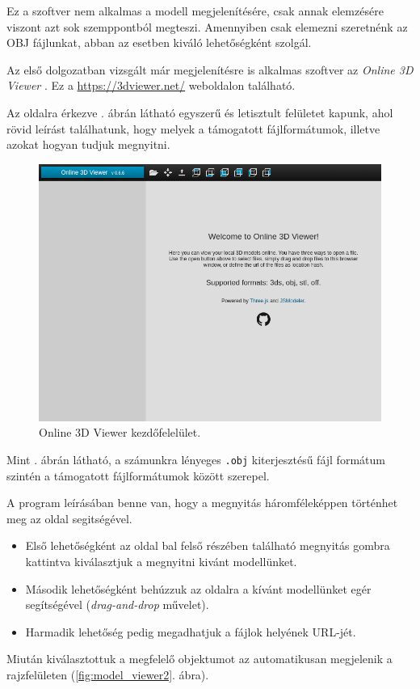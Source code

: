 Ez a szoftver nem alkalmas a modell megjelenítésére, csak annak elemzésére viszont azt sok szemppontból megteszi. Amennyiben csak elemezni szeretnénk az OBJ fájlunkat, abban az esetben kiváló lehetőségként szolgál.


Az első dolgozatban vizsgált már megjelenítésre is alkalmas szoftver az \textit{Online 3D Viewer} \cite{online2014viktor}.
Ez a \url{https://3dviewer.net/} weboldalon található.

Az oldalra érkezve . ábrán látható egyszerű és letisztult felületet kapunk, ahol rövid leírást találhatunk, hogy melyek a támogatott fájlformátumok, illetve azokat hogyan tudjuk megnyitni.

\begin{figure}[h]
\centering
\includegraphics[width=\textwidth]{images/Model_Viewer.png}
\caption{Online 3D Viewer kezdőfelelület.}
\label{fig:model_viewer1}
\end{figure}

Mint . ábrán látható, a számunkra lényeges \texttt{.obj} kiterjesztésű fájl formátum szintén a támogatott fájlformátumok között szerepel.

A program leírásában benne van, hogy a megnyitás háromféleképpen történhet meg az oldal segitségével.
\begin{itemize}
\item Első lehetőségként az oldal bal felső részében található megnyitás gombra kattintva kiválasztjuk a megnyitni kivánt modellünket.
\item Második lehetőségként behúzzuk az oldalra a kívánt modellünket egér segítségével (\textit{drag-and-drop} művelet).
\item Harmadik lehetőség pedig megadhatjuk a fájlok helyének URL-jét.
\end{itemize}
\newpage
Miután kiválasztottuk a megfelelő objektumot az automatikusan megjelenik a rajzfelületen  (\ref{fig:model_viewer2}. ábra).

